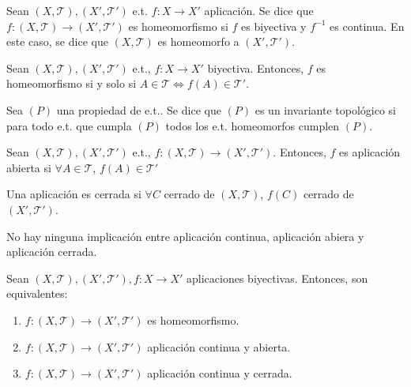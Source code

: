\begin{defn}
  Sean $( X, \mathcal{T} ), ( X', \mathcal{T}' )$ e.t. $f: X \to X'$ aplicación. Se dice que $f: ( X, \mathcal{T} ) \to ( X', \mathcal{T}' )$ es homeomorfismo si $f$ es biyectiva y $ f^{-1}$ es continua. En este caso, se dice que $( X, \mathcal{T} )$ es homeomorfo a $( X', \mathcal{T}' )$.
\end{defn}

\begin{obs}
 Sean $( X, \mathcal{T} ), ( X', \mathcal{T}' )$ e.t., $f: X \to X'$ biyectiva. Entonces, $f$ es homeomorfismo si y solo si $A \in \mathcal{T} \Leftrightarrow f(A) \in \mathcal{T}'$.
\end{obs}

\begin{defn}
  Sea $(P)$ una propiedad de e.t.. Se dice que $(P)$ es un invariante topológico si para todo e.t. que cumpla $(P)$ todos los e.t. homeomorfos cumplen $(P)$.
\end{defn}

\begin{defn}
  Sean $( X, \mathcal{T} ), ( X', \mathcal{T}' )$ e.t., $f: ( X, \mathcal{T} ) \to ( X', \mathcal{T}' )$. Entonces, $f$ es aplicación abierta si $\forall A \in \mathcal{T}$, $f(A) \in \mathcal{T}'$
\end{defn}

\begin{obs}
  Una aplicación es cerrada si $\forall C$ cerrado de $( X, \mathcal{T} )$, $f(C)$ cerrado de $( X', \mathcal{T}' )$.
\end{obs}

\begin{obs}
  No hay ninguna implicación entre aplicación continua, aplicación abiera y aplicación cerrada.
\end{obs}

\begin{prop}
  Sean $( X, \mathcal{T} ), ( X', \mathcal{T}' ), f: X \to X'$ aplicaciones biyectivas. Entonces, son equivalentes:
  \begin{enumerate}[label=(\roman*)]
    \item $f: ( X, \mathcal{T} ) \to ( X', \mathcal{T}' )$ es homeomorfismo.
    \item $f: ( X, \mathcal{T} ) \to ( X', \mathcal{T}' )$ aplicación continua y abierta.
    \item $f: ( X, \mathcal{T} ) \to ( X', \mathcal{T}' )$ aplicación continua y cerrada.
  \end{enumerate}
\end{prop}

